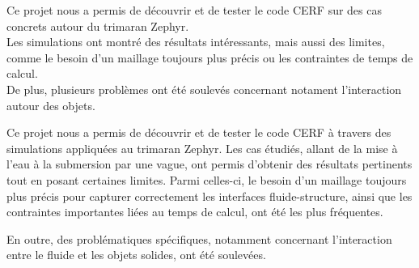 \documentclass[../main.tex]{subfiles}
\begin{document}
Ce projet nous a permis de découvrir et de tester le code CERF sur des cas concrets autour du trimaran Zephyr.\\
Les simulations ont montré des résultats intéressants, mais aussi des limites, comme le besoin d'un maillage toujours plus précis ou les contraintes de temps de calcul.\\
De plus, plusieurs problèmes ont été soulevés concernant notament l'interaction autour des objets.

Ce projet nous a permis de découvrir et de tester le code CERF à travers des simulations appliquées au trimaran Zephyr. Les cas étudiés, allant de la mise à l'eau à la submersion par une vague, ont permis d'obtenir des résultats pertinents tout en posant certaines limites. Parmi celles-ci, le besoin d'un maillage toujours plus précis pour capturer correctement les interfaces fluide-structure, ainsi que les contraintes importantes liées au temps de calcul, ont été les plus fréquentes.

En outre, des problématiques spécifiques, notamment concernant l'interaction entre le fluide et les objets solides, ont été soulevées.
\end{document}
